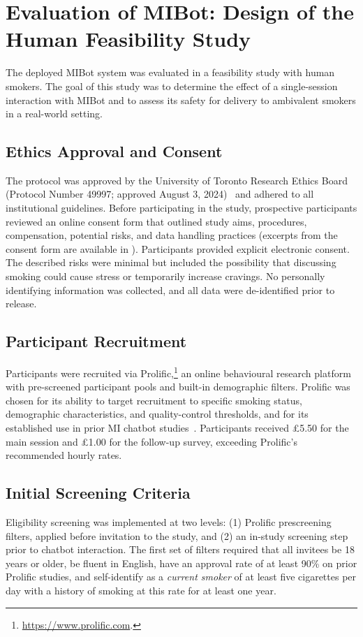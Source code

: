 \chapter{Evaluation of MIBot: Design of the Human Feasibility Study}
\label{ch:mibot-feasibility-study}
The deployed MIBot system was evaluated in a feasibility study with human smokers. The goal of this study was to determine the effect of a single-session interaction with MIBot and to assess its safety for delivery to ambivalent smokers in a real-world setting.

\section{Ethics Approval and Consent}
The protocol was approved by the University of Toronto Research Ethics Board (Protocol Number 49997; approved August 3, 2024)~\citep{rose2025ethics} and adhered to all institutional guidelines. Before participating in the study, prospective participants reviewed an online consent form that outlined study aims, procedures, compensation, potential risks, and data handling practices (excerpts from the consent form are available in ). Participants provided explicit electronic consent. The described risks were minimal but included the possibility that discussing smoking could cause stress or temporarily increase cravings. No personally identifying information was collected, and all data were de-identified prior to release.

\section{Participant Recruitment}
\label{sec:recruitment}
Participants were recruited via Prolific,\footnote{\url{https://www.prolific.com}.} an online behavioural research platform with pre-screened participant pools and built-in demographic filters. Prolific was chosen for its ability to target recruitment to specific smoking status, demographic characteristics, and quality-control thresholds, and for its established use in prior MI chatbot studies~\citep{brown2023mi,info:doi/10.2196/20251}. Participants received \pounds5.50 for the main session and \pounds1.00 for the follow-up survey, exceeding Prolific's recommended hourly rates.


\section{Initial Screening Criteria}
Eligibility screening was implemented at two levels: (1) Prolific prescreening filters, applied before invitation to the study, and (2) an in-study screening step prior to chatbot interaction. The first set of filters required that all invitees be 18 years or older, be fluent in English, have an approval rate of at least 90\% on prior Prolific studies, and self-identify as a \emph{current smoker} of at least five cigarettes per day with a history of smoking at this rate for at least one year.

